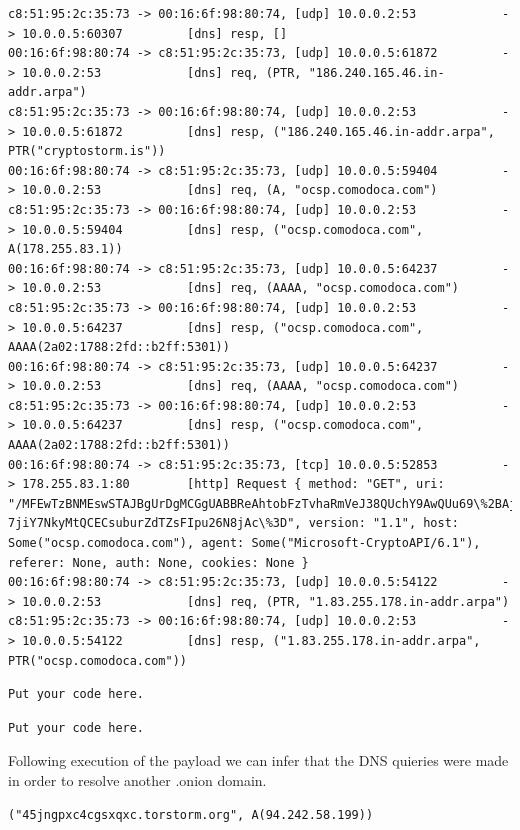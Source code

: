 \documentclass[11pt]{diazessay} %
\begin{document}
\begin{lstlisting}
c8:51:95:2c:35:73 -> 00:16:6f:98:80:74, [udp] 10.0.0.2:53            -> 10.0.0.5:60307         [dns] resp, []
00:16:6f:98:80:74 -> c8:51:95:2c:35:73, [udp] 10.0.0.5:61872         -> 10.0.0.2:53            [dns] req, (PTR, "186.240.165.46.in-addr.arpa")
c8:51:95:2c:35:73 -> 00:16:6f:98:80:74, [udp] 10.0.0.2:53            -> 10.0.0.5:61872         [dns] resp, ("186.240.165.46.in-addr.arpa", PTR("cryptostorm.is"))
00:16:6f:98:80:74 -> c8:51:95:2c:35:73, [udp] 10.0.0.5:59404         -> 10.0.0.2:53            [dns] req, (A, "ocsp.comodoca.com")
c8:51:95:2c:35:73 -> 00:16:6f:98:80:74, [udp] 10.0.0.2:53            -> 10.0.0.5:59404         [dns] resp, ("ocsp.comodoca.com", A(178.255.83.1))
00:16:6f:98:80:74 -> c8:51:95:2c:35:73, [udp] 10.0.0.5:64237         -> 10.0.0.2:53            [dns] req, (AAAA, "ocsp.comodoca.com")
c8:51:95:2c:35:73 -> 00:16:6f:98:80:74, [udp] 10.0.0.2:53            -> 10.0.0.5:64237         [dns] resp, ("ocsp.comodoca.com", AAAA(2a02:1788:2fd::b2ff:5301))
00:16:6f:98:80:74 -> c8:51:95:2c:35:73, [udp] 10.0.0.5:64237         -> 10.0.0.2:53            [dns] req, (AAAA, "ocsp.comodoca.com")
c8:51:95:2c:35:73 -> 00:16:6f:98:80:74, [udp] 10.0.0.2:53            -> 10.0.0.5:64237         [dns] resp, ("ocsp.comodoca.com", AAAA(2a02:1788:2fd::b2ff:5301))
00:16:6f:98:80:74 -> c8:51:95:2c:35:73, [tcp] 10.0.0.5:52853         -> 178.255.83.1:80        [http] Request { method: "GET", uri: "/MFEwTzBNMEswSTAJBgUrDgMCGgUABBReAhtobFzTvhaRmVeJ38QUchY9AwQUu69\%2BAj36pvE8hI6t
7jiY7NkyMtQCECsuburZdTZsFIpu26N8jAc\%3D", version: "1.1", host: Some("ocsp.comodoca.com"), agent: Some("Microsoft-CryptoAPI/6.1"), referer: None, auth: None, cookies: None }
00:16:6f:98:80:74 -> c8:51:95:2c:35:73, [udp] 10.0.0.5:54122         -> 10.0.0.2:53            [dns] req, (PTR, "1.83.255.178.in-addr.arpa")
c8:51:95:2c:35:73 -> 00:16:6f:98:80:74, [udp] 10.0.0.2:53            -> 10.0.0.5:54122         [dns] resp, ("1.83.255.178.in-addr.arpa", PTR("ocsp.comodoca.com"))
\end{lstlisting}
\begin{lstlisting}
Put your code here.
\end{lstlisting}
\begin{lstlisting}
Put your code here.
\end{lstlisting}

Following execution of the payload we can infer that the DNS quieries were made in order to resolve another .onion domain.

\begin{lstlisting}
("45jngpxc4cgsxqxc.torstorm.org", A(94.242.58.199))
\end{lstlisting}
\end{document}
